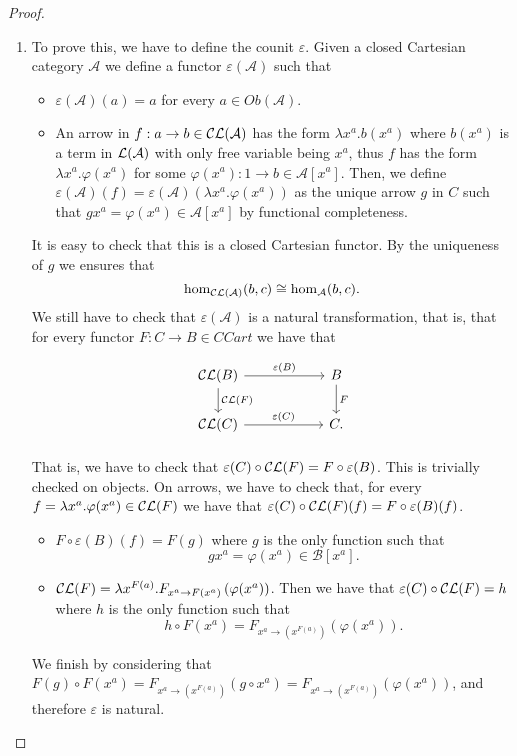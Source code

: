 \begin{definition}
\begin{proof}
  \begin{enumerate}
  \item[\fbox{$\CC \LL \cong 1_{\mathcal A}$}] To prove this, we have to define the counit $\varepsilon$. Given a closed Cartesian category $\mathcal A$ we define a functor  $\varepsilon(\mathcal A)$ such that
\begin{itemize}
\item $\varepsilon(\mathcal A)    (a) = a$ for every $a\in Ob(\mathcal A)$.
\item An arrow in $f:a\to b \in \mathcal{C} \mathcal{L}(\mathcal A)$ has the form $\lambda x^a. b(x^a)$ where $b(x^a)$ is a term in $\mathcal{L} (\mathcal A)$ with only free variable being $x^a$, thus $f$ has the form $\lambda x^a. \varphi(x^a)$ for some $\varphi(x^a): 1 \to b \in \mathcal A [x^a]$. Then, we define $\varepsilon(\mathcal A)(f) = \varepsilon(\mathcal A)(\lambda x^a.\varphi(x^a))$ as the unique arrow $g$ in $C$ such that $gx^a = \varphi(x^a) \in \mathcal A[x^a]$ by functional completeness.
\end{itemize}
It is easy to check that this is a closed Cartesian functor.  By the uniqueness of $g$ we ensures that $$\operatorname{hom}_{\mathcal{C}\mathcal{L}(\mathcal A)} (b,c)\cong \operatorname{hom}_{\mathcal A} (b,c).$$
We still have to check that $\varepsilon (\mathcal A)$ is a natural transformation, that is, that for every functor $F: C\to B\in CCart$ we have that
\[
  \begin{tikzpicture}
    \node {\begin{tikzcd}[column sep=20mm]
        \CC\LL(B)\ar[r,"\varepsilon(B)"]\ar[d,"\CC\LL(F)"] & B\ar[d,"F"]\\
        \CC\LL(C)\ar[r,"\varepsilon(C)"] & C.
    \end{tikzcd}};
\end{tikzpicture}
\]

That is, we have to check that $\varepsilon(C)\circ \mathcal{C}\mathcal{L}(F) = F \circ \varepsilon(B)$. This is trivially checked on objects. On arrows, we have to check that, for every $f = \lambda x^a.\varphi(x^a) \in \mathcal{C}\mathcal{L}(F) $ we have that $\varepsilon(C)\circ \mathcal{C}\mathcal{L}(F) (f)= F \circ \varepsilon(B)(f)$.

\begin{itemize}
\item  $F \circ \varepsilon(B)(f) = F(g)$ where $g$ is the only function  such that$$gx^a = \varphi(x^a) \in \mathcal B[x^a].$$
\item $\mathcal{C}\mathcal{L}(F) = \lambda x^{F(a)}.F_{x^a\to F(x^a)} \left ( \varphi(x^a)\right )$. Then we have that $\varepsilon(C)\circ \mathcal{C}\mathcal{L}(F) = h$ where $h$ is the only function such that $$h\circ F(x^a) = F_{x^a\to (x^{F(a)})}\left ( \varphi(x^a)\right ).$$
\end{itemize}
We finish by considering that $F(g)\circ F(x^a) = F_{x^a\to (x^{F(a)})}(g \circ x^a) = F_{x^a\to (x^{F(a)})}(\varphi(x^a)) $, and therefore $\varepsilon$ is natural.\\


\end{enumerate}
\end{proof}
\end{definition}
